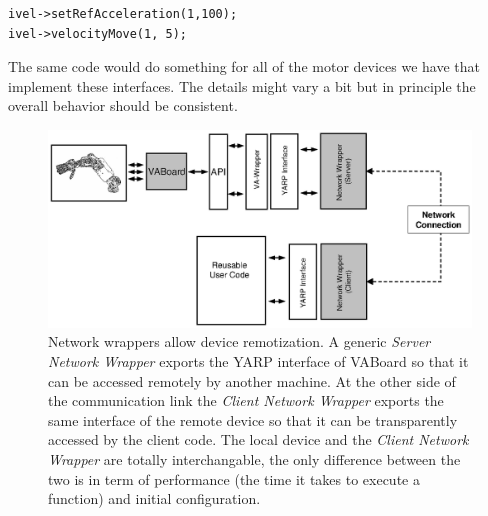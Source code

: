 \begin{verbatim}
ivel->setRefAcceleration(1,100);
ivel->velocityMove(1, 5);
\end{verbatim}


The same code would do something for all of the motor devices we
have that implement these interfaces.  The details might vary
a bit but in principle the overall behavior should be consistent.


\begin{figure}[tbp]
\centerline{
\includegraphics[width=24cm]{fig-devices3}
}
\caption{Network wrappers allow device remotization. A generic 
\emph{Server Network Wrapper} exports the YARP interface of VABoard so 
that it can be accessed remotely by another machine. At the 
other side of the 
communication link the \emph{Client Network Wrapper} exports the same 
interface of the remote device so that it can be transparently accessed 
by the client code. The local device and the \emph{Client Network Wrapper}
 are totally interchangable, the only difference between the two is in 
term of performance (the time it takes to execute a function) and
initial configuration.
}\label{fig:devices3}
\end{figure}


